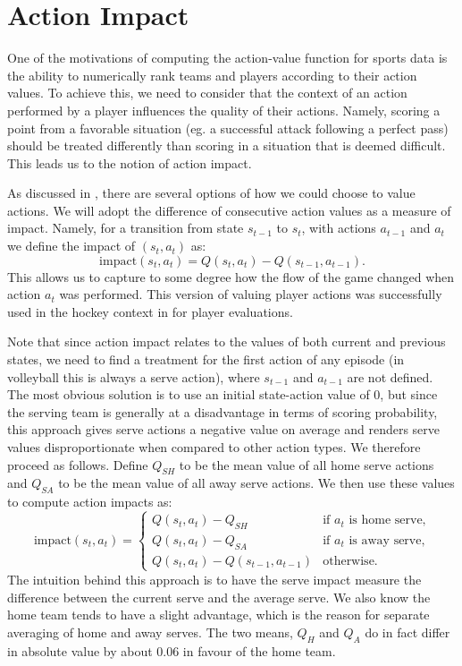 \documentclass{sfuthesis}
\begin{document}
	\section{Action Impact}
	
	One of the motivations of computing the action-value function for sports data is the ability to numerically rank teams and players according to their action values. To achieve this, we need to consider that the context of an action performed by a player influences the quality of their actions. Namely, scoring a point from a favorable situation (eg. a successful attack following a perfect pass) should be treated differently than scoring in a situation that is deemed difficult. This leads us to the notion of action impact.
	
	As discussed in \cite{routley2015markov}, there are several options of how we could choose to value actions. We will adopt the difference of consecutive action values as a measure of impact. Namely, for a transition from state $s_{t-1}$ to $s_t$, with actions $a_{t-1}$ and $a_t$ we define the impact of $(s_t, a_t)$ as:
	\begin{equation}
		\text{impact}(s_t,a_t) = Q(s_t,a_t) - Q(s_{t-1},a_{t-1}).
		\label{eq:action_impact}
	\end{equation}
	This allows us to capture to some degree how the flow of the game changed when action $a_t$ was performed. This version of valuing player actions was successfully used in the hockey context in \cite{liu2018deep} for player evaluations.
	
	Note that since action impact relates to the values of both current and previous states, we need to find a treatment for the first action of any episode (in volleyball this is always a serve action), where $s_{t-1}$ and $a_{t-1}$ are not defined. The most obvious solution is to use an initial state-action value of 0, but since the serving team is generally at a disadvantage in terms of scoring probability, this approach gives serve actions a negative value on average and renders serve values disproportionate when compared to other action types. We therefore proceed as follows. Define $Q_{SH}$ to be the mean value of all home serve actions and $Q_{SA}$ to be the mean value of all away serve actions. We then use these values to compute action impacts as:
	\begin{equation}
		\text{impact}(s_t,a_t) =
		\begin{cases} 
			Q(s_t,a_t) - Q_{SH} & \text{if } a_t \text{ is home serve,} \\
			Q(s_t,a_t) - Q_{SA} & \text{if } a_t \text{ is away serve,} \\
			Q(s_t,a_t) - Q(s_{t-1},a_{t-1}) & \text{otherwise.} 
		\end{cases}
		\label{eq:action_impact2}
	\end{equation}
	The intuition behind this approach is to have the serve impact measure the difference between the current serve and the average serve. We also know the home team tends to have a slight advantage, which is the reason for separate averaging of home and away serves. The two means, $Q_H$ and $Q_A$ do in fact differ in absolute value by about 0.06 in favour of the home team.
	
\end{document}
